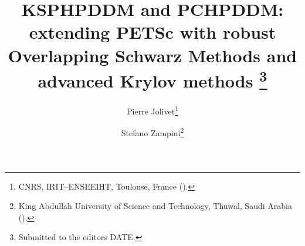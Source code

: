 

\usepackage{lipsum}
\usepackage{amsfonts}
\usepackage{graphicx}
\usepackage{epstopdf}
\usepackage{algorithmic}
\ifpdf
\else
\fi

\newcommand{\creflastconjunction}{, and~}



\title{KSPHPDDM and PCHPDDM: extending PETS\MakeLowercase{c} with robust Overlapping Schwarz Methods and advanced Krylov methods
\thanks{Submitted to the editors DATE.
}}

\author{Pierre Jolivet\thanks{CNRS, IRIT--ENSEEIHT, Toulouse, France 
  ().}
\and Stefano Zampini\thanks{King Abdullah University of Science and Technology, Thuwal, Saudi Arabia 
  ().}}

\usepackage{amsopn}
\DeclareMathOperator{\diag}{diag}


